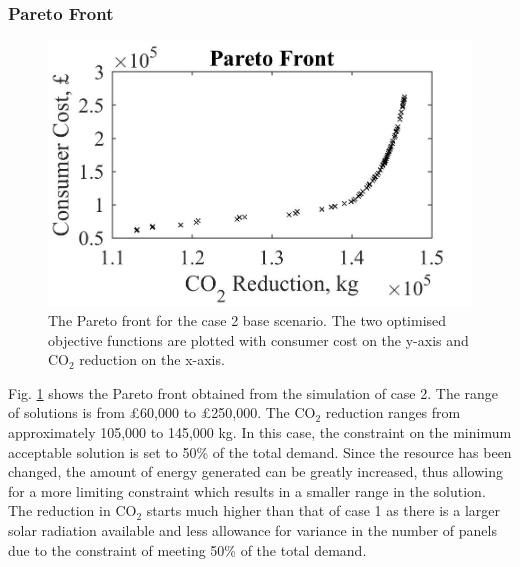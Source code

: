 \subsubsection{Pareto Front}

\begin{figure}[H]
	\centering
    \includegraphics[width=0.95\columnwidth]{Figures/ParetoFront2.jpg}
    \caption{The Pareto front for the case 2 base scenario. The two optimised objective functions are plotted with consumer cost on the y-axis and CO$_2$ reduction on the x-axis.}
    \label{fig:ParetoFront2}
\end{figure}

Fig. \ref{fig:ParetoFront2} shows the Pareto front obtained from the simulation of case 2. The range of solutions is from £60,000 to £250,000. The CO$_2$ reduction ranges from approximately 105,000 to 145,000 kg. In this case, the constraint on the minimum acceptable solution is set to 50\% of the total demand. Since the resource has been changed, the amount of energy generated can be greatly increased, thus allowing for a more limiting constraint which results in a smaller range in the solution. The reduction in CO$_2$ starts much higher than that of case 1 as there is a larger solar radiation available and less allowance for variance in the number of panels due to the constraint of meeting 50\% of the total demand.

